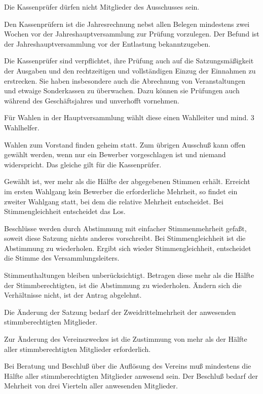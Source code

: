 \documentclass[10pt,a4paper,parskip=half]{scrartcl}
\begin{document}
\begin{contract}
\begin{multicols}{2}
    Die Kassenprüfer dürfen nicht Mitglieder des Ausschusses sein.
    
    Den Kassenprüfern ist die Jahresrechnung nebst allen Belegen mindestens zwei Wochen vor der Jahreshauptversammlung zur Prüfung vorzulegen. 
    Der Befund ist der Jahreshauptversammlung vor der Entlastung bekanntzugeben.
    
    Die Kassenprüfer sind verpflichtet,
    ihre Prüfung auch auf die Satzungsmäßigkeit der Ausgaben und den rechtzeitigen und vollständigen Einzug der Einnahmen zu erstrecken.
    Sie haben insbesondere auch die Abrechnung von Veranstaltungen und etwaige Sonderkassen zu überwachen.
    Dazu können sie Prüfungen auch während des Geschäftsjahres und unverhofft vornehmen.
    
    Für Wahlen in der Hauptversammlung wählt diese einen Wahlleiter und mind. 3 Wahlhelfer.
    
    Wahlen zum Vorstand finden geheim statt.
    Zum übrigen Ausschuß kann offen gewählt werden,
    wenn nur ein Bewerber vorgeschlagen ist und niemand widerspricht.
    Das gleiche gilt für die Kassenprüfer.
    
    Gewählt ist,
    wer mehr als die Hälfte der abgegebenen Stimmen erhält.
    Erreicht im ersten Wahlgang kein Bewerber die erforderliche Mehrheit,
    so findet ein zweiter Wahlgang statt,
    bei dem die relative Mehrheit entscheidet.
    Bei Stimmengleichheit entscheidet das Los.
    
    Beschlüsse werden durch Abstimmung mit einfacher Stimmenmehrheit gefaßt,
    soweit diese Satzung nichts anderes vorschreibt.
    Bei Stimmengleichheit ist die Abstimmung zu wiederholen.
    Ergibt sich wieder Stimmengleichheit,
    entscheidet die Stimme des Versammlungsleiters.
    
    Stimmenthaltungen bleiben unberücksichtigt.
    Betragen diese mehr als die Hälfte der Stimmberechtigten,
    ist die Abstimmung zu wiederholen.
    Ändern sich die Verhältnisse nicht,
    ist der Antrag abgelehnt.
    
    Die Änderung der Satzung bedarf der Zweidrittelmehrheit der anwesenden stimmberechtigten Mitglieder.
    
    Zur Änderung des Vereinszweckes ist die Zustimmung von mehr als der Hälfte aller stimmberechtigten Mitglieder erforderlich.
    
    Bei Beratung und Beschluß über die Auflösung des Vereins muß mindestens die Hälfte aller stimmberechtigten Mitglieder anwesend sein.
    Der Beschluß bedarf der Mehrheit von drei Vierteln aller anwesenden Mitglieder.
    

\end{multicols}
\end{contract}
\end{document}
